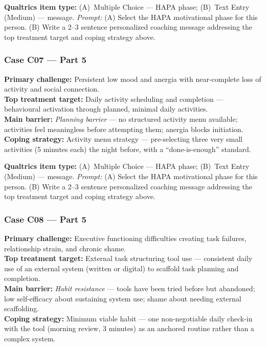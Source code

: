 \documentclass[11pt,a4paper]{article}
\newcommand{\haparesponse}[1]{\begin{tcolorbox}[colback=ResponseBG,colframe=GoldAmber,boxrule=0.6pt,arc=1.5mm,left=6pt,right=6pt,top=5pt,bottom=5pt]\small\textbf{\color{GoldAmber}Qualtrics item type:} (A)~Multiple Choice --- HAPA phase; (B)~Text Entry (Medium) --- message. \quad \textit{Prompt:} #1\end{tcolorbox}}
\begin{document}
\haparesponse{(A) Select the HAPA motivational phase for this person. (B) Write a 2--3 sentence personalized coaching message addressing the top treatment target and coping strategy above.}

\vspace{0.4em}

\subsubsection*{Case C07 --- Part 5}

\begin{contextbox}
\small
\textbf{Primary challenge:} Persistent low mood and anergia with near-complete loss of activity and social connection.\\
\textbf{Top treatment target:} Daily activity scheduling and completion --- behavioural activation through planned, minimal daily activities.\\
\textbf{Main barrier:} \textit{Planning barrier} --- no structured activity menu available; activities feel meaningless before attempting them; anergia blocks initiation.\\
\textbf{Coping strategy:} Activity menu strategy --- pre-selecting three very small activities (5 minutes each) the night before, with a ``done-is-enough'' standard.
\end{contextbox}

\haparesponse{(A) Select the HAPA motivational phase for this person. (B) Write a 2--3 sentence personalized coaching message addressing the top treatment target and coping strategy above.}

\vspace{0.4em}

\subsubsection*{Case C08 --- Part 5}

\begin{contextbox}
\small
\textbf{Primary challenge:} Executive functioning difficulties creating task failures, relationship strain, and chronic shame.\\
\textbf{Top treatment target:} External task structuring tool use --- consistent daily use of an external system (written or digital) to scaffold task planning and completion.\\
\textbf{Main barrier:} \textit{Habit resistance} --- tools have been tried before but abandoned; low self-efficacy about sustaining system use; shame about needing external scaffolding.\\
\textbf{Coping strategy:} Minimum viable habit --- one non-negotiable daily check-in with the tool (morning review, 3 minutes) as an anchored routine rather than a complex system.
\end{contextbox}
\end{document}
